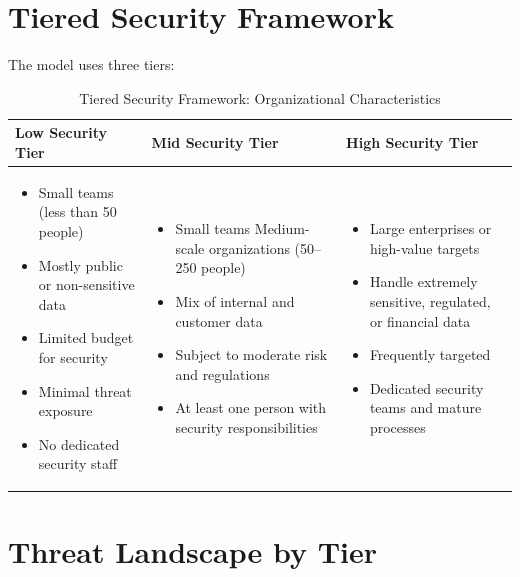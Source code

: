 \documentclass{article}
\begin{document}
\section{Tiered Security Framework}

The model uses three tiers:

\begin{table}[H]
\centering
\renewcommand{\arraystretch}{1.4}
\begin{tabular}{|p{4cm}|p{4cm}|p{4cm}|}
\hline
\textbf{Low Security Tier} & \textbf{Mid Security Tier} & \textbf{High Security Tier} \\ \hline

\begin{itemize}
    \item Small teams (less than 50 people)
    \item Mostly public or non-sensitive data
    \item Limited budget for security
    \item Minimal threat exposure
    \item No dedicated security staff
\end{itemize}
&
\begin{itemize}
    \item Small teams Medium-scale organizations (50–250 people)
    \item Mix of internal and customer data
    \item Subject to moderate risk and regulations
    \item At least one person with security responsibilities
\end{itemize}
&
\begin{itemize}
    \item Large enterprises or high-value targets
    \item Handle extremely sensitive, regulated, or financial data
    \item Frequently targeted
    \item Dedicated security teams and mature processes
\end{itemize}
\\ \hline
\end{tabular}
\caption{Tiered Security Framework: Organizational Characteristics}
\end{table}

\section{Threat Landscape by Tier}
\end{document}
